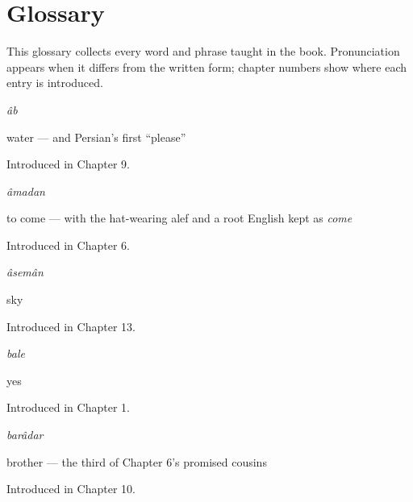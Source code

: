 
\chapter*{Glossary}

This glossary collects every word and phrase taught in the book. Pronunciation appears when it differs from the written form; chapter numbers show where each entry is introduced.

\noindent\begin{minipage}[t]{\linewidth}
\raggedright
\textbf{}\enspace\emph{âb}\par
\small water — and Persian's first \textquotedblleft{}please\textquotedblright{}\par
\footnotesize Introduced in Chapter 9.
\end{minipage}\par\medskip

\noindent\begin{minipage}[t]{\linewidth}
\raggedright
\textbf{}\enspace\emph{âmadan}\par
\small to come — with the hat-wearing alef and a root English kept as \emph{come}\par
\footnotesize Introduced in Chapter 6.
\end{minipage}\par\medskip

\noindent\begin{minipage}[t]{\linewidth}
\raggedright
\textbf{}\enspace\emph{âsemân}\par
\small sky\par
\footnotesize Introduced in Chapter 13.
\end{minipage}\par\medskip

\noindent\begin{minipage}[t]{\linewidth}
\raggedright
\textbf{}\enspace\emph{bale}\par
\small yes\par
\footnotesize Introduced in Chapter 1.
\end{minipage}\par\medskip

\noindent\begin{minipage}[t]{\linewidth}
\raggedright
\textbf{}\enspace\emph{barâdar}\par
\small brother — the third of Chapter 6's promised cousins\par
\footnotesize Introduced in Chapter 10.
\end{minipage}\par\medskip


